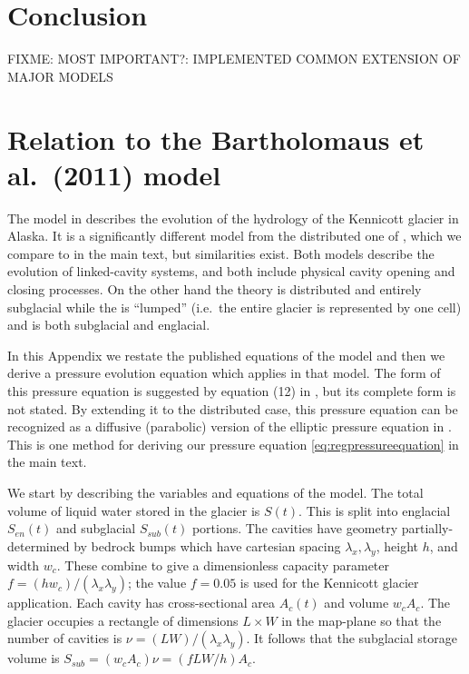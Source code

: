 \documentclass[11pt,final]{amsart}
\begin{document}
\section{Conclusion}  \label{sec:conclusion}

FIXME:  MOST IMPORTANT?:  IMPLEMENTED COMMON EXTENSION OF MAJOR MODELS


\small

\normalsize


\appendix
\small

\section{Relation to the Bartholomaus et al.~(2011) model}  \label{app:barth}

The model in \cite{Bartholomausetal2011} describes the evolution of the hydrology of the Kennicott glacier in Alaska.  It is a significantly different model from the distributed one of \cite{Schoofetal2012}, which we compare to in the main text, but similarities exist.  Both models describe the evolution of linked-cavity systems, and both include physical cavity opening and closing processes.  On the other hand the \cite{Schoofetal2012} theory is distributed and entirely subglacial while the \cite{Bartholomausetal2011} is ``lumped'' (i.e.~the entire glacier is represented by one cell) and is both subglacial and englacial.

In this Appendix we restate the published equations of the \cite{Bartholomausetal2011} model and then we derive a pressure evolution equation which applies in that model.  The form of this pressure equation is suggested by equation (12) in \cite{Bartholomausetal2011}, but its complete form is not stated.  By extending it to the distributed case, this pressure equation can be recognized as a diffusive (parabolic) version of the elliptic pressure equation in \cite{Schoofetal2012}.  This is one method for deriving our pressure equation \eqref{eq:regpressureequation} in the main text.

We start by describing the variables and equations of the \cite{Bartholomausetal2011} model.  The total volume of liquid water stored in the glacier is $S(t)$.  This is split into englacial $S_{en}(t)$ and subglacial $S_{sub}(t)$ portions.  The cavities have geometry partially-determined by bedrock bumps which have cartesian spacing $\lambda_x,\lambda_y$, height $h$, and width $w_c$.  These combine to give a dimensionless capacity parameter $f=(h w_c)/(\lambda_x \lambda_y)$; the value $f=0.05$ is used for the Kennicott glacier application.  Each cavity has cross-sectional area $A_c(t)$ and volume $w_c A_c$.  The glacier occupies a rectangle of dimensions $L\times W$ in the map-plane so that the number of cavities is $\nu = (LW)/(\lambda_x\lambda_y)$.  It follows that the subglacial storage volume is $S_{sub} = (w_c A_c) \nu = (f L W/h) A_c$.
\end{document}
